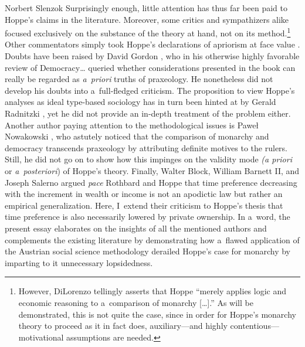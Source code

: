 \begin{artengenv}{Norbert Slenzok}
Surprisingly enough, little attention has thus far been paid to Hoppe's claims in the literature. Moreover, some critics 
\parencite[][]{sierpinski_critica_2016} %
 and sympathizers 
\parencite[][]{hulsmann_hoppean_2009} %
 alike focused exclusively on the substance of the theory at hand, not on its method.\footnote{However, DiLorenzo 
\parencite*[][p.274]{hulsmann_hoppean_2009} %
 tellingly asserts that Hoppe ``merely applies logic and economic reasoning to a~comparison of monarchy […].'' As will be demonstrated, this is not quite the case, since in order for Hoppe's monarchy theory to proceed as it in fact does, auxiliary---and highly contentious---motivational assumptions are needed. } Other commentators simply took Hoppe's declarations of apriorism at face value 
\parencites[][p.116]{crovelli_toward_2007}[][]{gabis_hans-hermann_2005}[][pp.113–114]{kalita_krytyka_2009}. %
 Doubts have been raised by David Gordon 
\parencite*[][p.99]{gordon_austro-libertarian_2017}, %
 who in his otherwise highly favorable review of Democracy… queried whether considerations presented in the book can really be regarded as \textit{a~priori} truths of praxeology. He nonetheless did not develop his doubts into a~full-fledged criticism. The proposition to view Hoppe's analyses as ideal type-based sociology has in turn been hinted at by Gerald Radnitzki 
\parencite*[][p.161]{hoppe_is_2003}, %
 yet he did not provide an in-depth treatment of the problem either. Another author paying attention to the methodological issues is Paweł Nowakowski 
\parencite*[][p.273]{nowakowski_dlaczego_2010}, %
 who astutely noticed that the comparison of monarchy and democracy transcends praxeology by attributing definite motives to the rulers. Still, he did not go on to show how this impinges on the validity mode \textit{(a priori} or \textit{a~posteriori}) of Hoppe's theory. Finally, Walter Block, William Barnett II, and Joseph Salerno 
\parencite*[][]{block_relationship_2006} %
 argued \textit{pace} Rothbard and Hoppe that time preference decreasing with the increment in wealth or income is not an apodictic law but rather an empirical generalization. Here, I~extend their criticism to Hoppe's thesis that time preference is also necessarily lowered by private ownership. In a~word, the present essay elaborates on the insights of all the mentioned authors and complements the existing literature by demonstrating how a~flawed application of the Austrian social science methodology derailed Hoppe's case for monarchy by imparting to it unnecessary lopsidedness.




\end{artengenv}
